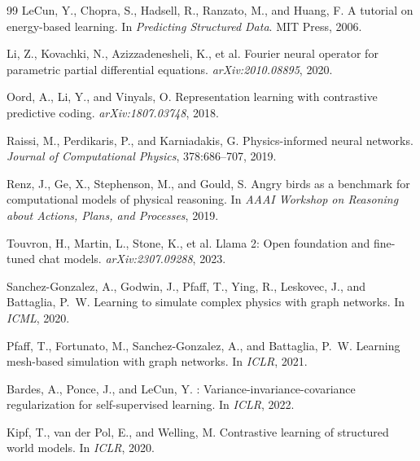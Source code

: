 \documentclass[10pt,twocolumn]{article}
\begin{document}
\begin{thebibliography}{99}
LeCun, Y., Chopra, S., Hadsell, R., Ranzato, M., and Huang, F.
\newblock A tutorial on energy-based learning.
\newblock In \emph{Predicting Structured Data}. MIT Press, 2006.

Li, Z., Kovachki, N., Azizzadenesheli, K., et al.
\newblock Fourier neural operator for parametric partial differential equations.
\newblock \emph{arXiv:2010.08895}, 2020.

Oord, A., Li, Y., and Vinyals, O.
\newblock Representation learning with contrastive predictive coding.
\newblock \emph{arXiv:1807.03748}, 2018.

Raissi, M., Perdikaris, P., and Karniadakis, G.
\newblock Physics-informed neural networks.
\newblock \emph{Journal of Computational Physics}, 378:686--707, 2019.

Renz, J., Ge, X., Stephenson, M., and Gould, S.
\newblock Angry birds as a benchmark for computational models of physical reasoning.
\newblock In \emph{AAAI Workshop on Reasoning about Actions, Plans, and Processes}, 2019.

Touvron, H., Martin, L., Stone, K., et al.
\newblock Llama 2: Open foundation and fine-tuned chat models.
\newblock \emph{arXiv:2307.09288}, 2023.

Sanchez-Gonzalez, A., Godwin, J., Pfaff, T., Ying, R., Leskovec, J., and Battaglia, P.~W.
\newblock Learning to simulate complex physics with graph networks.
\newblock In \emph{ICML}, 2020.

Pfaff, T., Fortunato, M., Sanchez-Gonzalez, A., and Battaglia, P.~W.
\newblock Learning mesh-based simulation with graph networks.
\newblock In \emph{ICLR}, 2021.

Bardes, A., Ponce, J., and LeCun, Y.
: Variance-invariance-covariance regularization for self-supervised learning.
\newblock In \emph{ICLR}, 2022.

Kipf, T., van der Pol, E., and Welling, M.
\newblock Contrastive learning of structured world models.
\newblock In \emph{ICLR}, 2020.

\end{thebibliography}
\end{document}

